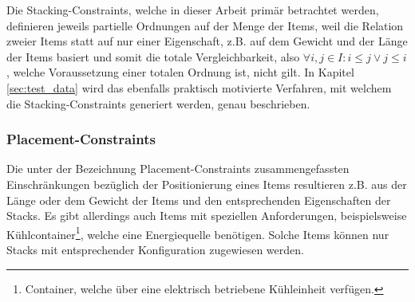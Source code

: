 \pagebreak

Die Stacking-Constraints, welche in dieser Arbeit primär betrachtet werden, definieren jeweils partielle
Ordnungen auf der Menge der Items, weil die Relation zweier Items statt auf nur einer Eigenschaft,
z.B. auf dem Gewicht und der Länge der Items basiert und somit die totale Vergleichbarkeit,
also $\forall i, j \in I : i \leq j \lor j \leq i$, welche Voraussetzung einer totalen Ordnung ist, nicht gilt.
In Kapitel \ref{sec:test_data} wird das ebenfalls praktisch motivierte Verfahren, mit welchem die
Stacking-Constraints generiert werden, genau beschrieben.

\pagebreak

\subsubsection{Placement-Constraints}
\label{sec:placement_restrictions}

Die unter der Bezeichnung Placement-Constraints zusammengefassten Einschränkungen bezüglich der Positionierung eines
Items resultieren z.B. aus der Länge oder dem Gewicht der Items und den entsprechenden Eigenschaften der Stacks. Es gibt allerdings auch Items mit speziellen Anforderungen, beispielsweise Kühlcontainer\footnote{Container, welche über eine elektrisch betriebene Kühleinheit verfügen.}, welche eine Energiequelle benötigen. Solche Items können nur Stacks mit entsprechender Konfiguration zugewiesen werden.


